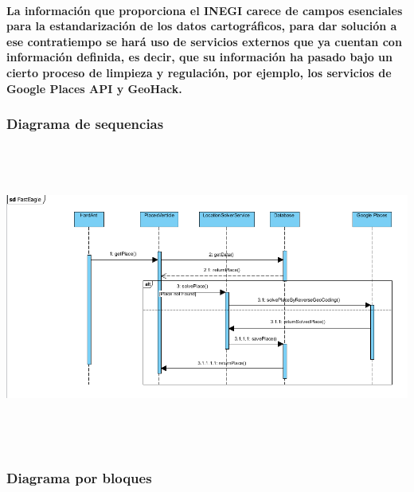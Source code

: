       \paragraph{La información que proporciona el INEGI carece de campos esenciales para la estandarización de los datos cartográficos, para dar solución a ese contratiempo se hará uso de servicios externos que ya cuentan con información definida, es decir, que su información ha pasado bajo un cierto proceso de limpieza y regulación, por ejemplo, los servicios de Google Places API y GeoHack.}
    \subsubsection{Diagrama de sequencias}
    \begin{center}
      \includegraphics[width=16cm,height=10cm]{./images/FastEagleSequenceDiagram}
    \end{center}

    \subsubsection{Diagrama por bloques}
